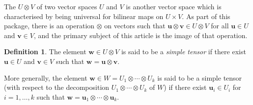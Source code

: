 \documentclass[12pt]{article}
\theoremstyle{definition}
\newtheorem{definition}[theorem]{Definition}
\newcommand{\vek}[1]{\mathbf{#1}}
\begin{document}
The  
$U \otimes V$ of two vector spaces $U$ and $V$ is 
another vector space which is characterised by being universal 
for bilinear maps on $U \times V$. As part of this package, 
there is an operation $\otimes$ on vectors such that 
\(\vek{u} \otimes \vek{v} \in U \otimes V\) for all 
\(\vek{u} \in U\) and \(\vek{v} \in V\), and the primary subject 
of this article is the image of that operation.


\begin{definition}
  The element \(\vek{w} \in U \otimes V\) is said to be a 
  \emph{simple tensor} if there exist \(\vek{u} \in U\) and \(\vek{v} 
  \in V\) such that \(\vek{w} = \vek{u} \otimes \vek{v}\).
  
  More generally, the element \(\vek{w} \in W = U_1 \otimes \dotsb 
  \otimes U_k\) is said to be a simple tensor (with respect to the 
  decomposition $U_1 \otimes \dotsb \otimes U_k$ of $W$) if there 
  exist \(\vek{u}_i \in U_i\) for \(i=1,\dotsc,k\) such that 
  \(\vek{w} = \vek{u}_1 \otimes \dotsb \otimes \vek{u}_k\).
\end{definition}
\end{document}
